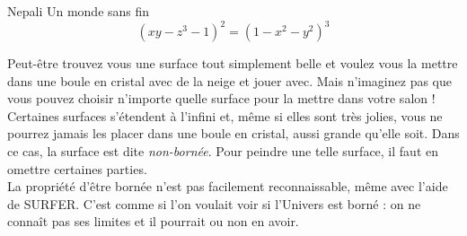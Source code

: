 \begin{surferPage}{Nepali}
Un monde sans fin \\

\smallskip
\[(x y - z^3 -1)^2= (1 - x^2	- y^2)^3\]

\singlespacing
Peut-être trouvez vous une surface tout simplement belle et voulez vous la mettre dans une boule en cristal avec de la neige et jouer avec. Mais n'imaginez pas que vous pouvez choisir n'importe quelle surface pour la mettre dans votre salon !
\\
\singlespacing
Certaines surfaces s'étendent à l'infini et, même si elles sont très jolies, vous ne pourrez jamais les placer dans une boule en cristal, aussi grande qu'elle soit. Dans ce cas, la surface est dite \textit{non-bornée}. Pour peindre une telle surface, il faut en omettre certaines parties.
\\
\singlespacing
La propriété d'être bornée n'est pas facilement reconnaissable, même avec l'aide de SURFER. C'est comme si l'on voulait voir si l'Univers est borné : on ne connaît pas ses limites et il pourrait ou non en avoir.
\end{surferPage}
